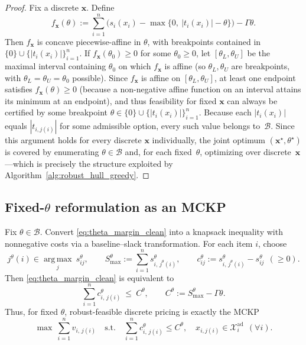 \documentclass[11pt, a4paper]{article}
\theoremstyle{plain}
\theoremstyle{definition}
\theoremstyle{remark}
\begin{document}
\begin{proof}
Fix a discrete $\bm x$. Define
\[
f_{\bm x}(\theta)
:=\sum_{i=1}^n\Big(s_i(x_i)-\max\{0,\ |t_i(x_i)|-\theta\}\Big)-\Gamma\theta.
\]
Then $f_{\bm x}$ is concave piecewise-affine in $\theta$, with breakpoints contained in $\{0\}\cup\{|t_i(x_i)|\}_{i=1}^n$.
If $f_{\bm x}(\theta_0)\ge 0$ for some $\theta_0\ge 0$, let $[\theta_L,\theta_U]$ be the maximal interval containing $\theta_0$ on which
$f_{\bm x}$ is affine (so $\theta_L,\theta_U$ are breakpoints, with $\theta_L=\theta_U=\theta_0$ possible). Since $f_{\bm x}$ is affine on
$[\theta_L,\theta_U]$, at least one endpoint satisfies $f_{\bm x}(\theta)\ge 0$ (because a non-negative affine function on an interval attains its minimum at an endpoint), and thus feasibility for fixed $\bm x$ can always be certified
by some breakpoint $\theta\in\{0\}\cup\{|t_i(x_i)|\}_{i=1}^n$. Because each $|t_i(x_i)|$ equals $|t_{i,j(i)}|$ for some admissible option,
every such value belongs to~$\mathcal B$. Since this argument holds for every discrete $\bm x$ individually, the joint optimum
$(\bm x^\star,\theta^\star)$ is covered by enumerating $\theta\in\mathcal B$ and, for each fixed~$\theta$, optimizing over discrete~$\bm x$---which is precisely the structure exploited by Algorithm~\ref{alg:robust_hull_greedy}.
\end{proof}

\subsection{Fixed-\texorpdfstring{$\theta$}{theta} reformulation as an MCKP}\label{subsec:theta_mckp}

Fix $\theta\in\mathcal B$. Convert \eqref{eq:theta_margin_clean} into a knapsack inequality with nonnegative costs via a baseline--slack
transformation. For each item $i$, choose
\[
j^\theta(i)\in\operatorname*{arg\,max}_{j}\ s^\theta_{ij},\qquad
S^\theta_{\max}:=\sum_{i=1}^n s^\theta_{i,\,j^\theta(i)},\qquad
c^\theta_{ij}:=s^\theta_{i,\,j^\theta(i)}-s^\theta_{ij}\ \ (\ge 0).
\]
Then \eqref{eq:theta_margin_clean} is equivalent to
\begin{equation}\label{eq:theta_knapsack_clean}
\sum_{i=1}^n c^\theta_{i,\,j(i)}\ \le\ C^\theta,
\qquad
C^\theta:=S^\theta_{\max}-\Gamma\theta.
\end{equation}
Thus, for fixed $\theta$, robust-feasible discrete pricing is exactly the MCKP
\begin{equation}\label{eq:mckp_theta_clean}
\max \ \sum_{i=1}^n v_{i,\,j(i)}
\quad\text{s.t.}\quad
\sum_{i=1}^n c^\theta_{i,\,j(i)}\le C^\theta,
\quad
x_{i,j(i)}\in\mathcal X_i^{\mathrm{ad}}\ \ (\forall i).
\end{equation}
\end{document}
